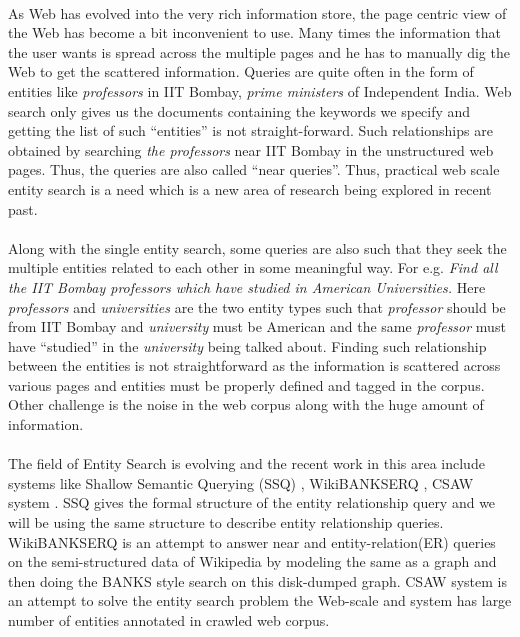 \documentclass[11pt]{report}
\begin{document}
\paragraph*{}
As Web has evolved into the very rich information store, the page centric view of the Web has become a bit inconvenient to use. Many times the information that the
user wants is spread across the multiple pages and he has to manually dig the Web to get the scattered information. Queries are quite often in the form of entities like
\textit{professors} in IIT Bombay, \textit{prime ministers} of Independent India. Web search only gives us the documents containing the keywords we specify and getting 
the list of such ``entities'' is not straight-forward. Such relationships are obtained by searching \textit{the professors} near IIT Bombay in the unstructured web pages. 
Thus, the queries are also called ``near queries''. Thus, practical web scale entity search is a need which is a new area of research being explored in recent past. 

\paragraph*{}
Along with the single entity search, some queries are also such that they seek the multiple entities related to each other in some meaningful way. For e.g. \textit{Find all the IIT Bombay 
professors which have studied in American Universities.} Here \textit{professors} and \textit{universities} are the two entity types such that \textit{professor} 
should be from IIT Bombay and \textit{university} must be American and the same \textit{professor} must have ``studied'' in the \textit{university} being talked about. Finding such 
relationship between the entities is not straightforward as the information is scattered across various pages and entities must be properly
defined and tagged in the corpus. Other challenge is the noise in the web corpus along with the huge amount of information.

\paragraph*{}
The field of Entity Search is evolving and the recent work in this area include systems like Shallow Semantic Querying (SSQ) \cite{ssq}, WikiBANKSERQ \cite{wikibanks}, CSAW system \cite{csaw}. SSQ gives the 
formal structure of the entity relationship query and we will be using the same structure to describe entity relationship queries. WikiBANKSERQ is an attempt to answer near 
and entity-relation(ER) queries on the semi-structured data of Wikipedia by modeling the same as a graph and then doing the BANKS \cite{banks} style search on this disk-dumped graph. CSAW system is an attempt 
to solve the entity search problem the Web-scale and system has large number of entities annotated in crawled web corpus. 
\end{document}
